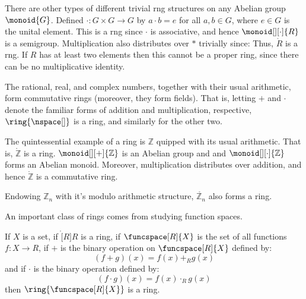     \begin{example}
        There are other types of different trivial rng structures on any
        Abelian group $\monoid{G}$. Defined $\cdot:G\times{G}\rightarrow{G}$
        by $a\cdot{b}=e$ for all $a,b\in{G}$, where $e\in{G}$ is the unital
        element. This is a rng since $\cdot$ is associative, and hence
        $\monoid[][\cdot]{R}$ is a semigroup. Multiplication also
        distributes over $*$ trivially since:
        \vspace{-2.5ex}
        Thus, $\ring{R}$ is a rng. If $R$ has at least two elements then
        this cannot be a proper ring, since there can be no multiplicative
        identity.
    \end{example}
    \begin{example}
        The rational, real, and complex numbers, together with their usual
        arithmetic, form commutative rings (moreover, they form fields).
        That is, letting $+$ and $\cdot$ denote the familiar forms of
        addition and multiplication, respective, $\ring{\nspace[]}$ is a
        ring, and similarly for the other two.
    \end{example}
    \begin{example}
        The quintessential example of a ring is $\mathbb{Z}$ quipped with
        its usual arithmetic. That is, $\ring{\mathbb{Z}}$ is a ring.
        $\monoid[][+]{\mathbb{Z}}$ is an Abelian group and and
        $\monoid[][\cdot]{\mathbb{Z}}$ forms an Abelian monoid. Moreover,
        multiplication distributes over addition, and hence
        $\ring{\mathbb{Z}}$ is a commutative ring.
    \end{example}
    \begin{example}
        Endowing $\mathbb{Z}_{n}$ with it's modulo arithmetic structure,
        $\ring{\mathbb{Z}_{n}}$ also forms a ring.
    \end{example}
    An important class of rings comes from studying function spaces.
    \begin{theorem}
        \label{thm:Ring_of_Funcs_is_Ring}%
        If $X$ is a set, if $\ring[R]{R}$ is a ring, if
        $\funcspace[R]{X}$ is the set of all functions $f:X\rightarrow{R}$,
        if $+$ is the binary operation on $\funcspace[R]{X}$ defined by:
        \begin{equation}
            (f+g)(x)=f(x)+_{R}g(x)
        \end{equation}
        and if $\cdot$ is the binary operation defined by:
        \begin{equation}
            (f\cdot{g})(x)=f(x)\cdot_{R}g(x)
        \end{equation}
        then $\ring{\funcspace[R]{X}}$ is a ring.
    \end{theorem}
